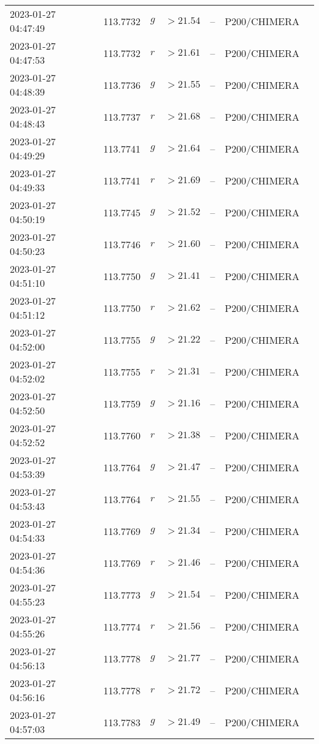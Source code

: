 \documentclass{nature_plusfigure}
\begin{document}
\begin{supplement}
\begin{center}
\begin{longtable}{lllllll}
2023-01-27 04:47:49 & 113.7732 & $g$ & $>21.54$ & -- & P200/CHIMERA &  \\ 
2023-01-27 04:47:53 & 113.7732 & $r$ & $>21.61$ & -- & P200/CHIMERA &  \\ 
2023-01-27 04:48:39 & 113.7736 & $g$ & $>21.55$ & -- & P200/CHIMERA &  \\ 
2023-01-27 04:48:43 & 113.7737 & $r$ & $>21.68$ & -- & P200/CHIMERA &  \\ 
2023-01-27 04:49:29 & 113.7741 & $g$ & $>21.64$ & -- & P200/CHIMERA &  \\ 
2023-01-27 04:49:33 & 113.7741 & $r$ & $>21.69$ & -- & P200/CHIMERA &  \\ 
2023-01-27 04:50:19 & 113.7745 & $g$ & $>21.52$ & -- & P200/CHIMERA &  \\ 
2023-01-27 04:50:23 & 113.7746 & $r$ & $>21.60$ & -- & P200/CHIMERA &  \\ 
2023-01-27 04:51:10 & 113.7750 & $g$ & $>21.41$ & -- & P200/CHIMERA &  \\ 
2023-01-27 04:51:12 & 113.7750 & $r$ & $>21.62$ & -- & P200/CHIMERA &  \\ 
2023-01-27 04:52:00 & 113.7755 & $g$ & $>21.22$ & -- & P200/CHIMERA &  \\ 
2023-01-27 04:52:02 & 113.7755 & $r$ & $>21.31$ & -- & P200/CHIMERA &  \\ 
2023-01-27 04:52:50 & 113.7759 & $g$ & $>21.16$ & -- & P200/CHIMERA &  \\ 
2023-01-27 04:52:52 & 113.7760 & $r$ & $>21.38$ & -- & P200/CHIMERA &  \\ 
2023-01-27 04:53:39 & 113.7764 & $g$ & $>21.47$ & -- & P200/CHIMERA &  \\ 
2023-01-27 04:53:43 & 113.7764 & $r$ & $>21.55$ & -- & P200/CHIMERA &  \\ 
2023-01-27 04:54:33 & 113.7769 & $g$ & $>21.34$ & -- & P200/CHIMERA &  \\ 
2023-01-27 04:54:36 & 113.7769 & $r$ & $>21.46$ & -- & P200/CHIMERA &  \\ 
2023-01-27 04:55:23 & 113.7773 & $g$ & $>21.54$ & -- & P200/CHIMERA &  \\ 
2023-01-27 04:55:26 & 113.7774 & $r$ & $>21.56$ & -- & P200/CHIMERA &  \\ 
2023-01-27 04:56:13 & 113.7778 & $g$ & $>21.77$ & -- & P200/CHIMERA &  \\ 
2023-01-27 04:56:16 & 113.7778 & $r$ & $>21.72$ & -- & P200/CHIMERA &  \\ 
2023-01-27 04:57:03 & 113.7783 & $g$ & $>21.49$ & -- & P200/CHIMERA &  \\ 

\end{longtable}
\end{center}
\end{supplement}
\end{document}
